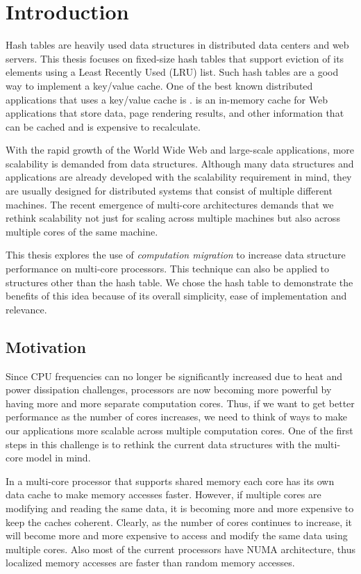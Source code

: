 \section{Introduction}
\label{chap:intro}

Hash tables are heavily used data structures in distributed data centers and web servers. This thesis focuses
on fixed-size hash tables that support eviction of its elements using a Least Recently Used (LRU) list. Such hash tables are a good way to
implement a key/value cache. One of the best known distributed applications that uses a key/value cache is 
\memcached{} \cite{memcached}. \memcached{} is an in-memory cache for Web applications that store  
data, page rendering results, and other information that can be cached and is expensive to recalculate.

With the rapid growth of the World Wide Web and large-scale applications, more scalability is demanded from data structures. 
Although many data structures and applications are already developed with the scalability requirement in mind, 
they are usually designed for distributed systems that consist of multiple different machines. The recent emergence of multi-core 
architectures demands that we rethink scalability not just for scaling across multiple machines but also across 
multiple cores of the same machine. 

This thesis explores the use of \textit{computation migration} to increase data structure performance on 
multi-core processors. This technique can also be applied to structures other than the hash table. We chose the 
hash table to demonstrate the benefits of this idea because of its overall simplicity, ease of implementation and relevance.

\subsection{Motivation}

Since CPU frequencies can no longer be significantly increased due to heat and power dissipation challenges, 
processors are now becoming more powerful by having more and more separate computation cores. Thus, if we want to 
get better performance as the number of cores increases, we need to think of ways to make our applications more scalable across 
multiple computation cores. One of the first steps in this challenge is to rethink the current data structures with 
the multi-core model in mind.  

In a multi-core processor that supports shared memory each core has its own data cache to make memory accesses faster. 
However, if multiple cores are modifying and reading the same data, it is becoming more and more expensive to keep the caches 
coherent. Clearly, as the number of cores continues to increase, it will become more and more expensive to access and modify 
the same data using multiple cores. Also most of the current processors have NUMA architecture, thus localized memory accesses
are faster than random memory accesses.

